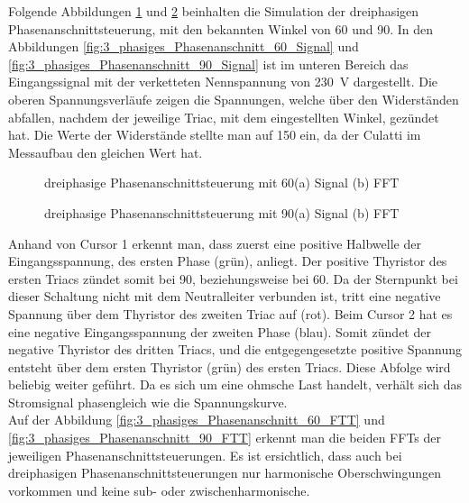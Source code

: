 Folgende Abbildungen \ref{fig:dreiphasige_Phasenanschnittsteuerung_mit_60} und \ref{fig:dreiphasige_Phasenanschnittsteuerung_mit_90} beinhalten die Simulation der dreiphasigen Phasenanschnittsteuerung, mit den bekannten Winkel von 60\textdegree\hspace{0.02cm} und 90\textdegree\hspace{0.02cm}.
In den Abbildungen \ref{fig:3_phasiges_Phasenanschnitt_60_Signal} und \ref{fig:3_phasiges_Phasenanschnitt_90_Signal} ist im  unteren Bereich das Eingangssignal mit der verketteten Nennspannung von \SI{230}{V} dargestellt. Die oberen Spannungsverläufe zeigen die Spannungen, welche über den Widerständen abfallen, nachdem der jeweilige Triac, mit dem eingestellten Winkel, gezündet hat. Die Werte der Widerstände stellte man auf \SI{150}{\Omega} ein, da der Culatti im Messaufbau den gleichen Wert hat. 

\begin{figure}[ht!]
	\centering
	\qquad
	\caption{dreiphasige Phasenanschnittsteuerung mit 60\textdegree (a) Signal (b) FFT}
	\label{fig:dreiphasige_Phasenanschnittsteuerung_mit_60}
\end{figure}


\begin{figure}[ht!]
	\centering
	\qquad
	\caption{dreiphasige Phasenanschnittsteuerung mit 90\textdegree (a) Signal (b) FFT}
	\label{fig:dreiphasige_Phasenanschnittsteuerung_mit_90}
\end{figure}
Anhand von Cursor 1 erkennt man, dass zuerst eine positive Halbwelle der Eingangsspannung, des ersten Phase (grün), anliegt. Der positive Thyristor des ersten Triacs zündet somit bei 90\textdegree, beziehungsweise bei 60\textdegree\hspace{0.02cm}. Da der Sternpunkt bei dieser Schaltung nicht mit dem Neutralleiter verbunden ist, tritt eine negative Spannung über dem Thyristor des zweiten Triac auf (rot). Beim Cursor 2 hat es eine negative Eingangsspannung der zweiten Phase (blau). Somit zündet der negative Thyristor des dritten Triacs, und die entgegengesetzte positive Spannung entsteht über dem ersten Thyristor (grün) des ersten Triacs. Diese Abfolge wird beliebig weiter geführt. Da es sich um eine ohmsche Last handelt, verhält sich das Stromsignal phasengleich wie die Spannungskurve.\\
Auf der Abbildung \ref{fig:3_phasiges_Phasenanschnitt_60_FTT} und \ref{fig:3_phasiges_Phasenanschnitt_90_FTT} erkennt man die beiden  FFTs der jeweiligen Phasenanschnittsteuerungen. Es ist ersichtlich, dass auch bei dreiphasigen Phasenanschnittsteuerungen nur harmonische Oberschwingungen vorkommen und keine sub- oder zwischenharmonische. 


